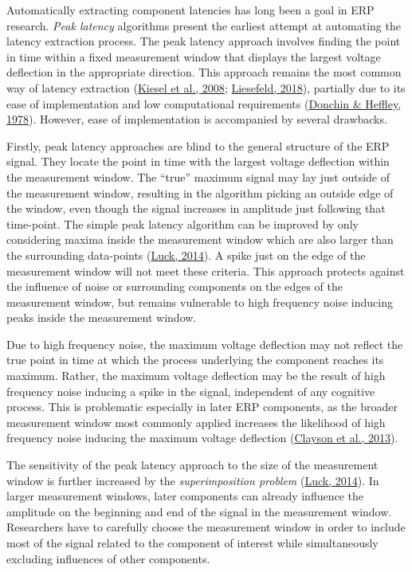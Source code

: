 \documentclass[
  man]{apa7}
\begin{document}
Automatically extracting component latencies has long been a goal in ERP research. \emph{Peak latency} algorithms present the earliest attempt at automating the latency extraction process. The peak latency approach involves finding the point in time within a fixed measurement window that displays the largest voltage deflection in the appropriate direction. This approach remains the most common way of latency extraction (\protect\hyperlink{ref-kiesel2008measurement}{Kiesel et al., 2008}; \protect\hyperlink{ref-liesefeld2018estimating}{Liesefeld, 2018}), partially due to its ease of implementation and low computational requirements (\protect\hyperlink{ref-donchin1978multivariate}{Donchin \& Heffley, 1978}). However, ease of implementation is accompanied by several drawbacks.

Firstly, peak latency approaches are blind to the general structure of the ERP signal. They locate the point in time with the largest voltage deflection within the measurement window. The ``true'' maximum signal may lay just outside of the measurement window, resulting in the algorithm picking an outside edge of the window, even though the signal increases in amplitude just following that time-point. The simple peak latency algorithm can be improved by only considering maxima inside the measurement window which are also larger than the surrounding data-points (\protect\hyperlink{ref-luck2014introduction}{Luck, 2014}). A spike just on the edge of the measurement window will not meet these criteria. This approach protects against the influence of noise or surrounding components on the edges of the measurement window, but remains vulnerable to high frequency noise inducing peaks inside the measurement window.

Due to high frequency noise, the maximum voltage deflection may not reflect the true point in time at which the process underlying the component reaches its maximum. Rather, the maximum voltage deflection may be the result of high frequency noise inducing a spike in the signal, independent of any cognitive process. This is problematic especially in later ERP components, as the broader measurement window most commonly applied increases the likelihood of high frequency noise inducing the maximum voltage deflection (\protect\hyperlink{ref-clayson2013noise}{Clayson et al., 2013}).

The sensitivity of the peak latency approach to the size of the measurement window is further increased by the \emph{superimposition problem} (\protect\hyperlink{ref-luck2014introduction}{Luck, 2014}). In larger measurement windows, later components can already influence the amplitude on the beginning and end of the signal in the measurement window. Researchers have to carefully choose the measurement window in order to include most of the signal related to the component of interest while simultaneously excluding influences of other components.
\end{document}
